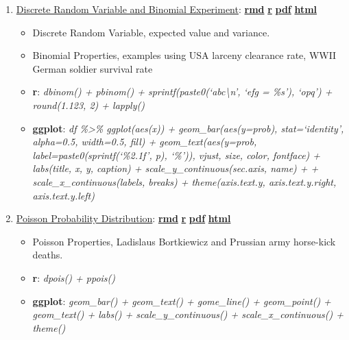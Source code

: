 \documentclass[
]{book}
\providecommand{\tightlist}{%
  \setlength{\itemsep}{0pt}\setlength{\parskip}{0pt}}
\begin{document}
\begin{enumerate}
\def\labelenumi{\arabic{enumi}.}
\tightlist
\item
  \href{https://fanwangecon.github.io/Stat4Econ/probability_discrete/htmlpdfr/binomial.html}{Discrete Random Variable and Binomial Experiment}: \href{https://github.com/FanWangEcon/Stat4Econ/blob/master/probability_discrete//binomial.Rmd}{\textbf{rmd}} \textbar{} \href{https://github.com/FanWangEcon/Stat4Econ/blob/master/probability_discrete/htmlpdfr/binomial.R}{\textbf{r}} \textbar{} \href{https://github.com/FanWangEcon/Stat4Econ/blob/master/probability_discrete/htmlpdfr/binomial.pdf}{\textbf{pdf}} \textbar{} \href{https://fanwangecon.github.io/Stat4Econ/probability_discrete/htmlpdfr/binomial.html}{\textbf{html}}

  \begin{itemize}
  \tightlist
  \item
    Discrete Random Variable, expected value and variance.
  \item
    Binomial Properties, examples using USA larceny clearance rate, WWII German soldier survival rate
  \item
    \textbf{r}: \emph{dbinom() + pbinom() + sprintf(paste0(`abc\textbackslash n', `efg = \%s'), `opq') + round(1.123, 2) + lapply()}
  \item
    \textbf{ggplot}: \emph{df \%\textgreater\% ggplot(aes(x)) + geom\_bar(aes(y=prob), stat=`identity', alpha=0.5, width=0.5, fill) + geom\_text(aes(y=prob, label=paste0(sprintf(`\%2.1f', p), `\%')), vjust, size, color, fontface) + labs(title, x, y, caption) + scale\_y\_continuous(sec.axis, name) + + scale\_x\_continuous(labels, breaks) + theme(axis.text.y, axis.text.y.right, axis.text.y.left)}
  \end{itemize}
\item
  \href{https://fanwangecon.github.io/Stat4Econ/probability_discrete/htmlpdfr/poisson.html}{Poisson Probability Distribution}: \href{https://github.com/FanWangEcon/Stat4Econ/blob/master/probability_discrete//poisson.Rmd}{\textbf{rmd}} \textbar{} \href{https://github.com/FanWangEcon/Stat4Econ/blob/master/probability_discrete/htmlpdfr/poisson.R}{\textbf{r}} \textbar{} \href{https://github.com/FanWangEcon/Stat4Econ/blob/master/probability_discrete/htmlpdfr/poisson.pdf}{\textbf{pdf}} \textbar{} \href{https://fanwangecon.github.io/Stat4Econ/probability_discrete/htmlpdfr/poisson.html}{\textbf{html}}

  \begin{itemize}
  \tightlist
  \item
    Poisson Properties, Ladislaus Bortkiewicz and Prussian army horse-kick deaths.
  \item
    \textbf{r}: \emph{dpois() + ppois()}
  \item
    \textbf{ggplot}: \emph{geom\_bar() + geom\_text() + gome\_line() + geom\_point() + geom\_text() + labs() + scale\_y\_continuous() + scale\_x\_continuous() + theme()}
  \end{itemize}
\end{enumerate}

  
\end{document}
